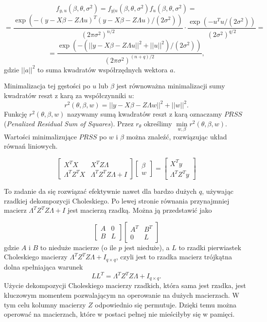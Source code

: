 \documentclass[12pt]{mwbk}
\theoremstyle{plain}
\theoremstyle{definition}
\theoremstyle{remark}
\begin{document}
$$f_{y,u}(\beta, \theta, \sigma^2)=f_{y|u}(\beta, \theta, \sigma^2)f_u(\beta, \theta, \sigma^2)=$$
$$=\frac{\exp(-(y-X\beta -Z \Lambda u)^T(y-X\beta-Z\Lambda u)/(2\sigma^2))}{(2\pi \sigma^2)^{n/2}}\cdot \frac{\exp(-u^Tu/(2\sigma^2))}{(2\sigma^2)^{q/2}}=$$
$$=\frac{\exp(-(||y-X\beta-Z\Lambda u||^2+||u||^2)/(2\sigma^2))}{(2\pi \sigma^2)^{(n+q)/2}},$$ gdzie $||a||^2$ to suma kwadratów współrzędnych wektora $a$.

Minimalizacja tej gęstości po $u$ lub $\beta$ jest równoważna minimalizacji sumy kwadratów reszt z karą za współczynniki $u$:
$$r^2(\theta, \beta, w)=||y-X\beta-Z\Lambda w||^2+||w||^2.$$ Funkcję $r^2(\theta, \beta, w)$ nazywamy sumą kwadratów reszt z karą oznaczamy $PRSS$ (\textit{Penalized Residual Sum of Squares}). Przez $r_{\theta}$ określimy $\min\limits_{w,\beta} r^2(\theta, \beta,w)$. Wartości minimalizujące $PRSS$ po $w$ i $\beta$ można znaleźć, rozwiązując układ równań liniowych.

\begin{equation} \label{eq:ukladPRSS}
\begin{bmatrix}
X^TX & X^TZ\Lambda \\
\Lambda^TZ^TX & \Lambda^TZ^TZ\Lambda +I
\end{bmatrix}
\begin{bmatrix}
\beta \\
w
\end{bmatrix}=
\begin{bmatrix}
X^Ty\\
\Lambda^TZ^Ty
\end{bmatrix}
\end{equation}

To zadanie da się rozwiązać efektywnie nawet dla bardzo dużych $q$, używając rzadkiej dekompozycji Choleskiego. Po lewej stronie równania przynajmniej macierz $\Lambda^TZ^TZ\Lambda+I$ jest macierzą rzadką. Można ją przedstawić jako

$$\begin{bmatrix}
A & 0 \\
B & L
\end{bmatrix}
\begin{bmatrix}
A^T & B^T\\
0 & L
\end{bmatrix}
$$
gdzie $A$ i $B$ to nieduże macierze (o ile $p$ jest nieduże), a $L$ to rzadki pierwiastek Choleskiego macierzy $\Lambda^TZ^TZ\Lambda+I_{q\times q}$, czyli jest to rzadka macierz trójkątna dolna spełniająca warunek $$LL^T=\Lambda^TZ^TZ\Lambda +I_{q \times q}.$$ Użycie dekompozycji Choleskiego macierzy rzadkich, która sama jest rzadka, jest kluczowym momentem pozwalającym na operowanie na dużych macierzach. W tym celu kolumny macierzy $Z$ odpowiednio się permutuje. Dzięki temu można operować na macierzach, które w postaci pełnej nie mieściłyby się w pamięci.
\end{document}
